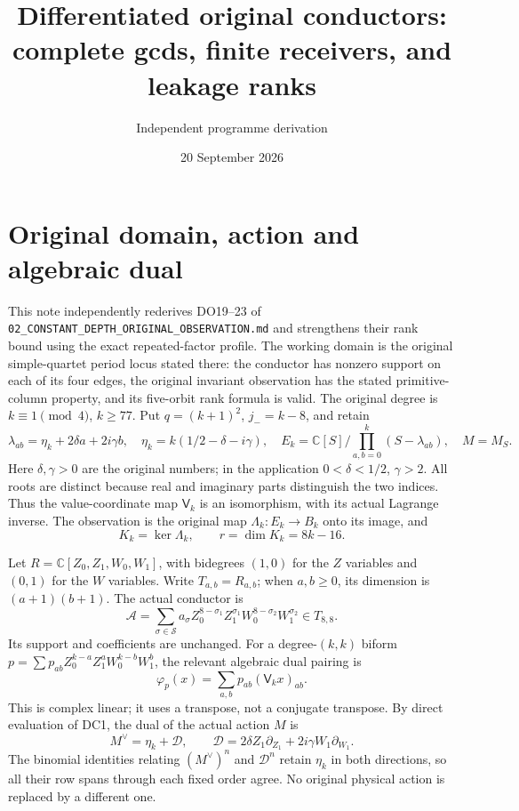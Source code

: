 \documentclass[11pt]{article}
\title{Differentiated original conductors: complete gcds, finite receivers, and leakage ranks}
\author{Independent programme derivation}
\date{20 September 2026}
\newcommand{\C}{\mathbb C}
\begin{document}
\maketitle

\section{Original domain, action and algebraic dual}
This note independently rederives DO19--23 of
\texttt{02\_CONSTANT\_DEPTH\_ORIGINAL\_OBSERVATION.md} and strengthens
their rank bound using the exact repeated-factor profile.  The working
domain is the original simple-quartet period locus stated there: the
conductor has nonzero support on each of its four edges, the original
invariant observation has the stated primitive-column property, and its
five-orbit rank formula is valid.  The original degree is
$k\equiv1\pmod4$, $k\ge77$.  Put $q=(k+1)^2$, $j_-=k-8$, and retain
\[
 \lambda_{ab}=\eta_k+2\delta a+2i\gamma b,\quad
 \eta_k=k(1/2-\delta-i\gamma),\quad
 E_k=\C[S]/\prod_{a,b=0}^k(S-\lambda_{ab}),
 \quad M=M_S.                                                   \tag{DC1}
\]
Here $\delta,\gamma>0$ are the original numbers; in the application
$0<\delta<1/2$, $\gamma>2$.  All roots are distinct because real and
imaginary parts distinguish the two indices.  Thus the value-coordinate
map $\mathsf V_k$ is an isomorphism, with its actual Lagrange inverse.
The observation is the original map $\Lambda_k:E_k\to B_k$ onto its
image, and
\[
 K_k=\ker\Lambda_k,\qquad r=\dim K_k=8k-16.                      \tag{DC2}
\]

Let $R=\C[Z_0,Z_1,W_0,W_1]$, with bidegrees $(1,0)$ for the $Z$
variables and $(0,1)$ for the $W$ variables.  Write $T_{a,b}=R_{a,b}$;
when $a,b\ge0$, its dimension is $(a+1)(b+1)$.  The actual conductor is
\[
 \mathcal A=\sum_{\sigma\in\mathcal S}a_\sigma
 Z_0^{8-\sigma_1}Z_1^{\sigma_1}
 W_0^{8-\sigma_2}W_1^{\sigma_2}\in T_{8,8}.                       \tag{DC3}
\]
Its support and coefficients are unchanged.  For a degree-$(k,k)$
biform $p=\sum p_{ab}Z_0^{k-a}Z_1^aW_0^{k-b}W_1^b$, the relevant
algebraic dual pairing is
\[
 \varphi_p(x)=\sum_{a,b}p_{ab}(\mathsf V_kx)_{ab}.                \tag{DC4}
\]
This is complex linear; it uses a transpose, not a conjugate transpose.
By direct evaluation of DC1, the dual of the actual action $M$ is
\[
 M^\vee=\eta_k+\mathcal D,\qquad
 \mathcal D=2\delta Z_1\partial_{Z_1}
                 +2i\gamma W_1\partial_{W_1}.                   \tag{DC5}
\]
The binomial identities relating $(M^\vee)^n$ and $\mathcal D^n$
retain $\eta_k$ in both directions, so all their row spans through
each fixed order agree.  No original physical action is replaced by a
different one.
\end{document}
